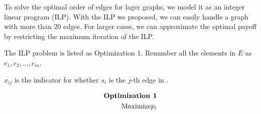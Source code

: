 \documentclass[letterpaper]{article}
\begin{document}
To solve the optimal order of edges for lager graphs, we model it as an integer linear program (ILP).
With the ILP we proposed, we can easily handle a graph with more than 20 edges.
For larger cases, we can approximate the optimal payoff by restricting the maximum iteration of the ILP.

The ILP problem is listed as Optimization 1.
Renumber all the elements in $E$ as $e_1,e_2,\ldots,e_m$.

 $x_{ij}$ is the indicator for whether $s_i$ is the $j$-th edge in .

\begin{equation}
	\begin{aligned}
	\text{\textbf{Optimization 1}}\\
	\text{Maximize}p_i
	\end{aligned}
\end{equation}



\newpage


\end{document}
